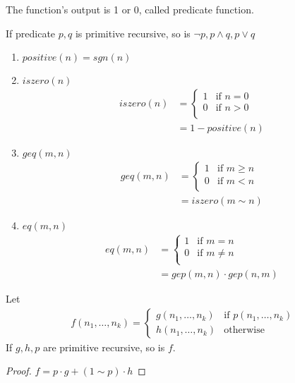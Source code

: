 \begin{definition}
    The function's output is 1 or 0, called predicate function. 
\end{definition}

\begin{corollary}
    If predicate $p, q$ is primitive recursive, so is $\neg p, p\land  q, p\lor q$
\end{corollary}

\begin{enumerate}
    \item $positive(n)=sgn(n)$
    \item $iszero(n)$
    \begin{align*}
        iszero(n)&=\left\{ \begin{array}{ll}
            1 & \text{if }n=0\\
            0 & \text{if }n>0\\
        \end{array} \right.\\
        &=1-positive(n)
    \end{align*}
    \item $geq(m,n)$
    \begin{align*}
        geq(m,n)&=\left\{ \begin{array}{ll}
            1 & \text{if }m\ge n\\
            0 & \text{if }m<n\\
        \end{array} \right.\\
        &=iszero(m\sim n)
    \end{align*}
    \item $eq(m,n)$
    \begin{align*}
        eq(m,n)&=\left\{ \begin{array}{ll}
            1 & \text{if }m= n\\
            0 & \text{if }m\ne n\\
        \end{array} \right.\\
        &=gep(m, n)\cdot gep(n,m)
    \end{align*}
\end{enumerate}

\begin{corollary}
    Let 
    \begin{align*}
        f(n_1,\dots,n_k)=\left\{ \begin{array}{ll}
            g(n_1,\dots,n_k)& \text{if }p(n_1,\dots,n_k)\\
            h(n_1,\dots,n_k)&\text{otherwise}
        \end{array} \right.
    \end{align*}
    If $g,h,p$ are primitive recursive, so is $f$. 
\end{corollary}
\begin{proof}
    $f=p\cdot g+(1\sim p)\cdot h$
\end{proof}

